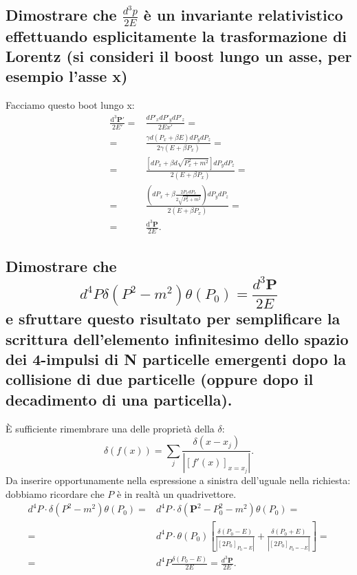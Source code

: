 \subsection[\hspace{2mm} ]{Dimostrare che $\frac{d^3 p  }{2E}$ è un invariante relativistico effettuando esplicitamente la trasformazione di Lorentz (si consideri il boost lungo un asse, per esempio l'asse x)}
Facciamo questo boot lungo x:
\begin{align*}
	\frac{\mbox{d}^3 \boldsymbol{P}'}{2E'}  =& \frac{dP'_x dP'_y dP'_z}{2Ex'} = \\
	=& \frac{\gamma d\left( P_x + \beta E \right)dP_y dP_z }{2 \gamma\left( E + \beta P_x \right)} = \\
	=& \frac{ \left[ dP_x + \beta d \sqrt{P_x^2 + m^2}\right]dP_y dP_z  }{2\left( E + \beta P_x \right) } = \\ 
	=& \frac{\left( dP_x + \beta\frac{2P_x dP_x}{2\sqrt{P_x^2 + m^2} } \right)dP_y dP_z }{2\left( E + \beta P_x \right)} = \\
	= & \frac{\mbox{d}^3 \boldsymbol{P}}{2E}
.\end{align*}

\subsection[\hspace{2mm} ]{Dimostrare che 
\[
d^{4}P \delta\left( P^2-m^2 \right) \theta\left( P_0 \right) = \frac{d^3 \boldsymbol{P} }{2E}
\]
e sfruttare questo risultato per semplificare la scrittura dell’elemento infinitesimo dello spazio dei 4-impulsi di N particelle emergenti dopo la collisione di due particelle (oppure dopo il decadimento di una particella).}
È sufficiente rimembrare una delle proprietà della $\delta$:
\[
	\delta\left( f\left( x \right)  \right) = \sum_{j} \frac{\delta\left( x-x_j \right) }{\left| \left[ f'\left( x \right)  \right]_{x = x_j} \right| }
.\] 
Da inserire opportunamente nella espressione a sinistra dell'uguale nella richiesta: dobbiamo ricordare che $P$ è in realtà un quadrivettore.
\begin{align*}
	d^{4}P \cdot \delta\left( P^2-m^2 \right) \theta\left( P_0 \right) =& d^4P\cdot  \delta\left(\boldsymbol{P}^2 - P_0^2 - m^2 \right) \theta\left( P_0 \right)  = \\
	=& d^4 P \cdot  \theta\left( P_0 \right) \left[ \frac{\delta\left( P_0 - E \right) }{\left| \left[ 2P_0 \right]_{P_0 = E} \right| } + 
		\frac{\delta\left( P_0 + E \right) }{\left| \left[ 2P_0 \right]_{P_0 = -E}  \right| } \right] =\\
		=& d^4P \frac{\delta\left( P_0 - E \right)}{2E} = \frac{d^3 \boldsymbol{P}}{2E}   
.\end{align*}
